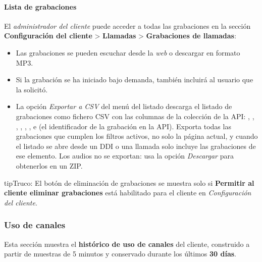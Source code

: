 \documentclass[letterpaper,10pt,spanish]{sphinxmanual}
\begin{document}
\paragraph{Lista de grabaciones}
\label{administration_portal/client/residential/calls/call_recordings:recordings-list}
El \emph{administrador del cliente} puede acceder a todas las grabaciones en la sección \textbf{Configuración del cliente} \textgreater{} \textbf{Llamadas} \textgreater{} \textbf{Grabaciones de llamadas}:
\begin{itemize}
\item {} 
Las grabaciones se pueden escuchar desde la \emph{web} o descargar en formato MP3.

\item {} 
Si la grabación se ha iniciado bajo demanda, también incluirá al usuario que la solicitó.

\item {} 
La opción \emph{Exportar a CSV} del menú del listado descarga el listado de grabaciones como fichero CSV con las columnas de la colección de la API: , , , , , ,  e  (el identificador de la grabación en la API). Exporta todas las grabaciones que cumplen los filtros activos, no solo la página actual, y cuando el listado se abre desde un DDI o una llamada solo incluye las grabaciones de ese elemento. Los audios no se exportan: usa la opción \emph{Descargar} para obtenerlos en un ZIP.

\end{itemize}

\begin{notice}{tip}{Truco:}
El botón de eliminación de grabaciones se muestra solo si \textbf{Permitir al cliente eliminar grabaciones} está habilitado para el cliente en \emph{Configuración del cliente}.
\end{notice}


\subsubsection{Uso de canales}
\label{administration_portal/client/residential/calls/channel_usage:channel-usage}\label{administration_portal/client/residential/calls/channel_usage::doc}
Esta sección muestra el \textbf{histórico de uso de canales} del cliente, construido a partir de muestras de 5 minutos y conservado durante los últimos \textbf{30 días}.
\end{document}
